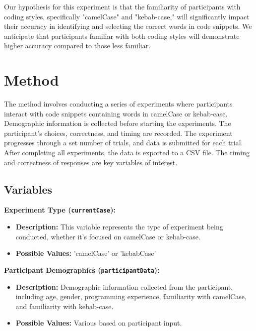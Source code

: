 \documentclass{article}
\begin{document}
\begin{tcolorbox}[title=Hypothesis]
    Our hypothesis for this experiment is that the familiarity of participants with coding styles, specifically "camelCase" and "kebab-case," will significantly impact their accuracy in identifying and selecting the correct words in code snippets. We anticipate that participants familiar with both coding styles will demonstrate higher accuracy compared to those less familiar.
\end{tcolorbox}



\section{Method}
The method involves conducting a series of experiments where participants interact with code snippets containing words in camelCase or kebab-case. Demographic information is collected before starting the experiments. The participant's choices, correctness, and timing are recorded. The experiment progresses through a set number of trials, and data is submitted for each trial. After completing all experiments, the data is exported to a CSV file. The timing and correctness of responses are key variables of interest.
\subsection{Variables}

\begin{tcolorbox}[title=Independent Variables]

\textbf{Experiment Type (\texttt{currentCase}):}
\begin{itemize}
    \item \textbf{Description:} This variable represents the type of experiment being conducted, whether it's focused on camelCase or kebab-case.
    \item \textbf{Possible Values:} 'camelCase' or 'kebabCase'
\end{itemize}

\textbf{Participant Demographics (\texttt{participantData}):}
\begin{itemize}
    \item \textbf{Description:} Demographic information collected from the participant, including age, gender, programming experience, familiarity with camelCase, and familiarity with kebab-case.
    \item \textbf{Possible Values:} Various based on participant input.
\end{itemize}

\end{tcolorbox}
\end{document}
